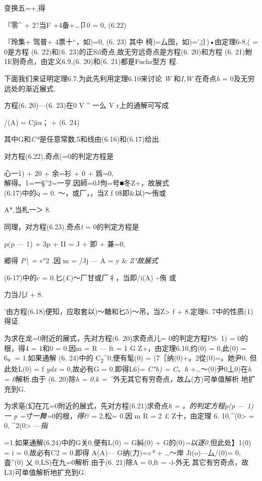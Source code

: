\documentclass{article}
\begin{document}
变换五=+,得

『零\^{} + 2?当F +4备+\ldots{}卩0 = 0, (6.22)

『玲集+ 驾普+ 4票十``，如)=0, (6. 23) 其中
椅)=厶囹，如)='』｝)•由定理6-8,( = 0是方程 (6. 22)和(6.
23)的正Sil奇点,故无穷远奇点是方程(6. 20)和方程 (6.
21)鮒1E则奇点，由定义6.9,(6. 20)和(6. 21)都是Fuchs型方 程.

下面我们来证明定理6.7.为此先利用定理6.10来讨论 \emph{W} 和\emph{I,W}
在奇点\emph{h} = 0及无穷远处的渐近展式.

方程(6. 20)---(6. 23)在0 V '' 一么\textbar{} V r上的通解可写成

/(A) = Cjiu； + (6. 24)

其中G和\emph{C*}是任意常数,5和线由(6.16)和(6.17)给出.

对方程(6.22),奇点(=0的判定方程是

心一1) + 20 + 余=衫 + 0 + 爲=0,\\
解得。1=一§''2=一亨.因師=0J佝=号■冬Z+，故展式\\
(6.17)中的\textsc{q} = 0. 〜，或厂，，当Z f 0\$即\&以)〜侑或

A*,当札一＞ 8.

同理，对方程(6.23),奇点\emph{t} = 0的判定方程是

p(p --- 1) + 3p + II = J + 即 + 兼=0,

郷得 \emph{P\textbackslash{} =} »\textbar{}°2 .因 m = /Jj --- A = y \&
\emph{Z"故展式}

(6-17)中的c = 0.匕(£)〜厂甘或厂彳，当即/i(A) \textasciitilde{}侑 或

力当儿f + 8.

'由方程(6.18)便知，应取套以)〜糖和匕5)〜吊，当Z\textgreater{} f +
8.定理6. 7中的性质(1)得证.

为求在龙=0附近的展式，先对方程(6. 20)求奇点儿= 0的判定方程PS- 1) =
0的根，得4 = 1和0 = 0.因m = R --- ft = 1 G Z+，由定理6.10,约(0) =
0,此(0) = 6。= 1.如果通解 (6. 24)中的 C\textsubscript{2}\^{}0,便有髦(0)
= (7［纳(0)+。2從(0)=。她尹0, 但此处L(0) = f \emph{ydx} = 0,故必有G =
0.即得L6)= \emph{C"h) = C、h} +\ldots{}〜(0)尹0丄0)在\emph{h =
0}解析.由于 (6. 20)除\emph{h = 0,k =
\^{}}外无其它有穷奇点，故厶(方)可单值解析 地扩充到G.

为求亳(幻在兀=0附近的展式，先对方程(6.21)求奇点\emph{h = 。的判定方程p(p
--- 1) 一 p =寸一舞=}0的根，\emph{得\&} = 2,松= 0.因 m R = 2 £
Z十，由定理 6. 10,\^{}(0\textgreater{} = 0, \^{}2(0\textgreater{}
---\emph{指}

=1.如果通解(6.24)中的G关0,便有L(0) = G糾(0) +
G的(0)\emph{=以逐0,}但此处】1(0) = i = 0,故必有C2 = 0.即得 A(A)---
G纳(力)=\emph{c*} + \ldots{}〜岸 Ji(o)---厶/(0)= 0, 査''(0) 乂
0,LS)在九=0解析.由于(6. 21)除A = 0,ft = -i-外无
其它有穷奇点，故L3)可单值解析地扩充到G.
\end{document}
